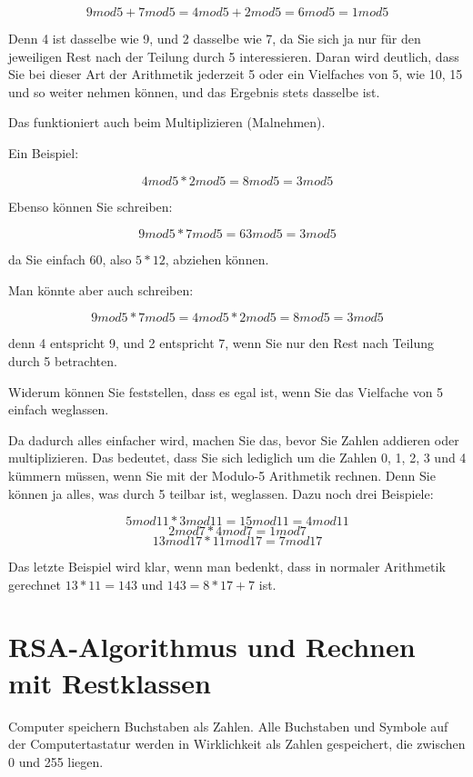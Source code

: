 \documentclass[a4paper,11pt, oneside,openright,titlepage,dvips]{scrbook}
\newcommand{\bmod}{mod}
\newcounter{chapter}
\newcounter{section}[chapter]
\begin{document}
\[ 9 \bmod 5 + 7 \bmod5 = 4 \bmod 5 + 2 \bmod 5 = 6 \bmod 5 =
   1 \bmod 5                                                   \]

Denn 4 ist dasselbe wie 9, und 2 dasselbe wie 7, da Sie sich ja nur für
den jeweiligen Rest nach der Teilung durch 5 interessieren.  Daran
wird deutlich, dass Sie bei dieser Art der Arithmetik jederzeit 5 oder
ein Vielfaches von 5, wie 10, 15 und so weiter nehmen können, und das
Ergebnis stets dasselbe ist.


\clearpage
Das funktioniert auch beim Multiplizieren (Malnehmen).

Ein Beispiel:

\[ 4 \bmod 5 * 2 \bmod 5 = 8 \bmod 5 = 3 \bmod 5  \]

Ebenso können Sie schreiben:

\[ 9 \bmod 5 * 7 \bmod 5 = 63 \bmod 5 = 3 \bmod 5 \]

da Sie einfach 60, also $5 * 12$, abziehen können.

Man könnte aber auch schreiben:

\[ 9 \bmod 5 * 7 \bmod 5 = 4 \bmod 5 * 2 \bmod 5 = 8 \bmod 5 = 3 \bmod
5 \]

denn 4 entspricht 9, und 2 entspricht 7, wenn Sie nur den Rest
nach Teilung durch 5 betrachten.

Widerum können Sie feststellen, dass es egal ist, wenn Sie das Vielfache
von 5 einfach weglassen.

Da dadurch alles einfacher wird, machen Sie das, bevor Sie
Zahlen addieren oder multiplizieren. Das bedeutet, dass Sie sich
lediglich um die Zahlen 0, 1, 2, 3 und 4 kümmern müssen, wenn
Sie mit der Modulo-5 Arithmetik rechnen. Denn Sie können ja
alles, was durch 5 teilbar ist, weglassen.
Dazu noch drei Beispiele:

\[ 5 \bmod 11 * 3 \bmod 11 = 15 \bmod 11 = 4 \bmod 11 \]
\[ 2 \bmod 7 * 4 \bmod 7 = 1 \bmod 7                  \]
\[ 13 \bmod 17 * 11 \bmod 17 = 7 \bmod 17             \]

Das letzte Beispiel wird klar, wenn man bedenkt, dass in normaler
Arithmetik gerechnet $ 13 * 11 = 143 $ und $ 143 = 8 * 17 + 7 $ ist.


\clearpage
\section{RSA-Algorithmus und Rechnen mit Restklassen}

Computer speichern Buchstaben als Zahlen. Alle Buchstaben und Symbole
auf der Computertastatur werden in Wirklichkeit als Zahlen
gespeichert, die zwischen 0 und 255 liegen.
\end{document}
